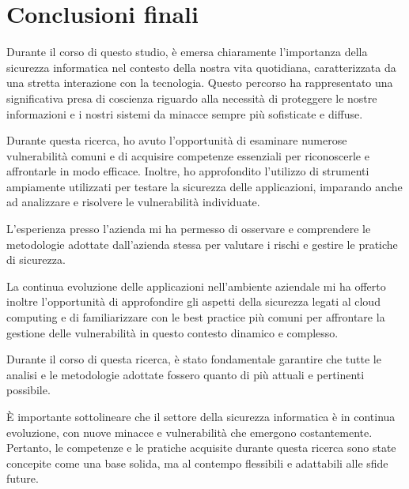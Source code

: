 \chapter{Conclusioni finali}
Durante il corso di questo studio, è emersa chiaramente l'importanza della sicurezza informatica nel contesto della nostra vita quotidiana, caratterizzata da una stretta interazione con la tecnologia. Questo percorso ha rappresentato una significativa presa di coscienza riguardo alla necessità di proteggere le nostre informazioni e i nostri sistemi da minacce sempre più sofisticate e diffuse.

Durante questa ricerca, ho avuto l'opportunità di esaminare numerose vulnerabilità comuni e di acquisire competenze essenziali per riconoscerle e affrontarle in modo efficace. Inoltre, ho approfondito l'utilizzo di strumenti ampiamente utilizzati per testare la sicurezza delle applicazioni, imparando anche ad analizzare e risolvere le vulnerabilità individuate.

L'esperienza presso l'azienda mi ha permesso di osservare e comprendere le metodologie adottate dall'azienda stessa per valutare i rischi e gestire le pratiche di sicurezza. 

La continua evoluzione delle applicazioni nell'ambiente aziendale mi ha offerto inoltre l'opportunità di approfondire gli aspetti della sicurezza legati al cloud computing e di familiarizzare con le best practice più comuni per affrontare la gestione delle vulnerabilità in questo contesto dinamico e complesso.

Durante il corso di questa ricerca, è stato fondamentale garantire che tutte le analisi e le
 metodologie adottate fossero quanto di più attuali e pertinenti possibile. 

 È importante sottolineare che il settore della 
sicurezza informatica è in continua evoluzione, con nuove minacce e
 vulnerabilità che emergono costantemente. Pertanto, le competenze e 
 le pratiche acquisite durante questa ricerca sono state concepite come 
 una base solida, ma al contempo flessibili e adattabili alle sfide future. 